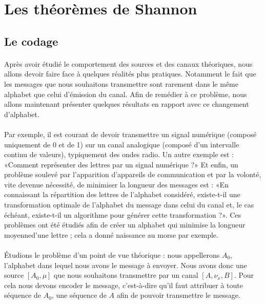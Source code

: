 \section{Les théorèmes de Shannon}

\subsection{Le codage}
	\paragraph{}
	Après avoir étudié le comportement des sources et des canaux théoriques, 
	nous allons devoir faire face à quelques réalités plus pratiques. 
	Notamment le fait que les messages que nous souhaitons transmettre sont 
	rarement dans le même alphabet que celui d'émission du canal. Afin de 
	remédier à ce problème, nous allons maintenant présenter quelques
	résultats en rapport avec ce changement d'alphabet. 
	
	\paragraph{}
	Par exemple, il est courant de devoir transmettre un signal numérique
	(composé uniquement de 0 et de 1) sur un canal analogique (composé 
	d'un intervalle continu de valeurs), typiquement des ondes radio.
	Un autre exemple est : «Comment représenter des 
	lettres par un signal numérique ?» Et enfin, un problème soulevé par 
	l'apparition d'appareils de communication et par la volonté, vite
	devenue nécessité, de minimiser la longueur des messages est :
	«En connaissant la répartition des lettres de l'alphabet considéré,
	existe-t-il une transformation optimale de l'alphabet du message
	dans celui du canal et, le cas échéant, existe-t-il un algorithme pour 
	générer cette transformation ?». Ces problèmes ont été étudiés afin de
	créer un alphabet qui minimise la longueur moyenned'une lettre ; 
	cela a donné naissance au morse par exemple. 
	
	\paragraph{}
	Étudions le problème d'un point de vue théorique :
	nous appellerons $A_0$, l'alphabet dans lequel nous avons le message à 
	envoyer. Nous avons donc une source $[A_0,\mu]$ que nous souhaitons
	transmettre par un canal $[A,\nu_x,B]$. Pour cela nous devons encoder
	le message, c'est-à-dire qu'il faut attribuer à toute séquence de 
	$A_0$, une séquence de $A$ afin de pouvoir transmettre le message.

